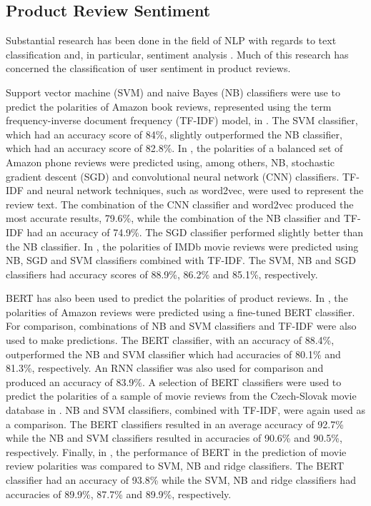 \subsection{Product Review Sentiment} \label{sec:LR_NLP_Sent}

Substantial research has been done in the field of NLP with regards to text classification and, in particular, sentiment analysis \cite{mironczuk2018recent}. Much of this research has concerned the classification of user sentiment in product reviews.

Support vector machine (SVM) and naive Bayes (NB) classifiers were use to predict the polarities of Amazon book reviews, represented using the term frequency-inverse document frequency (TF-IDF) model, in \cite{dey2020comparative}. The SVM classifier, which had an accuracy score of 84\%, slightly outperformed the NB classifier, which had an accuracy score of 82.8\%. In \cite{aljuhani2019comparison}, the polarities of a balanced set of Amazon phone reviews were predicted using, among others, NB, stochastic gradient descent (SGD) and convolutional neural network (CNN) classifiers. TF-IDF and neural network techniques, such as word2vec, were used to represent the review text. The combination of the CNN classifier and word2vec produced the most accurate results, 79.6\%, while the combination of the NB classifier and TF-IDF had an accuracy of 74.9\%. The SGD classifier performed slightly better than the NB classifier. In \cite{tripathy2016classification}, the polarities of IMDb movie reviews were predicted using NB, SGD and SVM classifiers combined with TF-IDF. The SVM, NB and SGD classifiers had accuracy scores of 88.9\%, 86.2\% and 85.1\%, respectively.

BERT has also been used to predict the polarities of product reviews. In \cite{geetha2021improving}, the polarities of Amazon reviews were predicted using a fine-tuned BERT classifier. For comparison, combinations of NB and SVM classifiers and TF-IDF were also used to make predictions. The BERT classifier, with an accuracy of 88.4\%, outperformed the NB and SVM classifier which had accuracies of 80.1\% and 81.3\%, respectively. An RNN classifier was also used for comparison and produced an accuracy of 83.9\%. A selection of BERT classifiers were used to predict the polarities of a sample of movie reviews from the Czech-Slovak movie database in \cite{lehevcka2020bert}. NB and SVM classifiers, combined with TF-IDF, were again used as a comparison. The BERT classifiers resulted in an average accuracy of 92.7\% while the NB and SVM classifiers resulted in accuracies of 90.6\% and 90.5\%, respectively. Finally, in \cite{gonzalez2020comparing}, the performance of BERT in the prediction of movie review polarities was compared to SVM, NB and ridge classifiers. The BERT classifier had an accuracy of 93.8\% while the SVM, NB and ridge classifiers had accuracies of 89.9\%, 87.7\% and 89.9\%, respectively.

